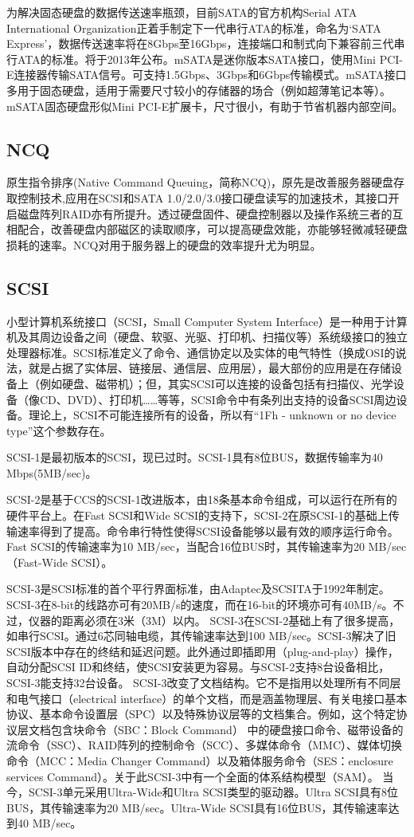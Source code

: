 为解决固态硬盘的数据传送速率瓶颈，目前SATA的官方机构Serial ATA International Organization正着手制定下一代串行ATA的标准，命名为‘SATA Express’，数据传送速率将在8Gbps至16Gbps，连接端口和制式向下兼容前三代串行ATA的标准。将于2013年公布。mSATA是迷你版本SATA接口，使用Mini PCI-E连接器传输SATA信号。可支持1.5Gbps、3Gbps和6Gbps传输模式。mSATA接口多用于固态硬盘，适用于需要尺寸较小的存储器的场合（例如超薄笔记本等）。mSATA固态硬盘形似Mini PCI-E扩展卡，尺寸很小，有助于节省机器内部空间。

\subsection{NCQ}
原生指令排序(Native Command Queuing，简称NCQ)，原先是改善服务器硬盘存取控制技术,应用在SCSI和SATA 1.0/2.0/3.0接口硬盘读写的加速技术，其接口开启磁盘阵列RAID亦有所提升。透过硬盘固件、硬盘控制器以及操作系统三者的互相配合，改善硬盘内部磁区的读取顺序，可以提高硬盘效能，亦能够轻微减轻硬盘损耗的速率。NCQ对用于服务器上的硬盘的效率提升尤为明显。

\subsection{SCSI}
小型计算机系统接口（SCSI，Small Computer System Interface）是一种用于计算机及其周边设备之间（硬盘、软驱、光驱、打印机、扫描仪等）系统级接口的独立处理器标准。SCSI标准定义了命令、通信协定以及实体的电气特性（换成OSI的说法，就是占据了实体层、链接层、通信层、应用层），最大部份的应用是在存储设备上（例如硬盘、磁带机）；但，其实SCSI可以连接的设备包括有扫描仪、光学设备（像CD、DVD）、打印机……等等，SCSI命令中有条列出支持的设备SCSI周边设备。理论上，SCSI不可能连接所有的设备，所以有“1Fh - unknown or no device type”这个参数存在。

SCSI-1是最初版本的SCSI，现已过时。SCSI-1具有8位BUS，数据传输率为40 Mbps(5MB/sec)。

SCSI-2是基于CCS的SCSI-1改进版本，由18条基本命令组成，可以运行在所有的硬件平台上。在Fast SCSI和Wide SCSI的支持下，SCSI-2在原SCSI-1的基础上传输速率得到了提高。命令串行特性使得SCSI设备能够以最有效的顺序运行命令。Fast SCSI的传输速率为10 MB/sec，当配合16位BUS时，其传输速率为20 MB/sec（Fast-Wide SCSI）。

SCSI-3是SCSI标准的首个平行界面标准，由Adaptec及SCSITA于1992年制定。SCSI-3在8-bit的线路亦可有20MB/s的速度，而在16-bit的环境亦可有40MB/s。不过，仪器的距离必须在3米（3M）以内。 SCSI-3在SCSI-2基础上有了很多提高，如串行SCSI。通过6芯同轴电缆，其传输速率达到100 MB/sec。SCSI-3解决了旧SCSI版本中存在的终结和延迟问题。此外通过即插即用（plug-and-play）操作，自动分配SCSI ID和终结，使SCSI安装更为容易。与SCSI-2支持8台设备相比，SCSI-3能支持32台设备。 SCSI-3改变了文档结构。它不是指用以处理所有不同层和电气接口（electrical interface）的单个文档，而是涵盖物理层、有关电接口基本协议、基本命令设置层（SPC）以及特殊协议层等的文档集合。例如，这个特定协议层文档包含块命令（SBC：Block Command） 中的硬盘接口命令、磁带设备的流命令（SSC）、RAID阵列的控制命令（SCC）、多媒体命令（MMC）、媒体切换命令（MCC：Media Changer Command）以及箱体服务命令（SES：enclosure services Command）。关于此SCSI-3中有一个全面的体系结构模型（SAM）。 当今，SCSI-3单元采用Ultra-Wide和Ultra SCSI类型的驱动器。Ultra SCSI具有8位BUS，其传输速率为20 MB/sec。Ultra-Wide SCSI具有16位BUS，其传输速率达到40 MB/sec。

